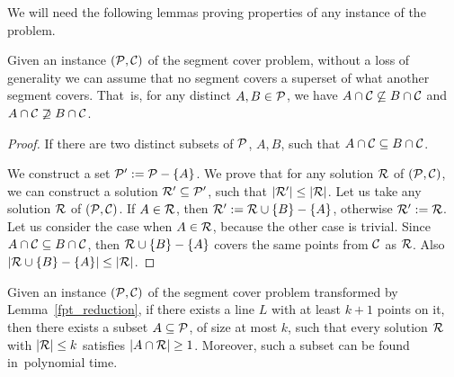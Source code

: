 We will need the following lemmas proving properties of any
instance of the problem.

\begin{lemma}
   \label{fpt_reduction}
   Given an instance $(\mathcal{P}, \mathcal{C})$ of the segment cover problem,
   without a loss of generality we can assume that
   no segment covers a superset of what another segment covers.
   That~is, for any distinct $A, B \in \mathcal{P}$, we have
   $A \cap \mathcal{C} \not \subseteq B \cap \mathcal{C}$ and $A \cap \mathcal{C} \not \supseteq B \cap \mathcal{C}$.
\end{lemma}   
   
\begin{proof} 
If there are two distinct subsets of $\mathcal{P}$,
$A, B$, such that $A \cap \mathcal{C} \subseteq B \cap \mathcal{C}$.

We construct a set $\mathcal{P}' := \mathcal{P} - \{A\}$.
We prove that for any solution $\mathcal{R}$ of $(\mathcal{P}, \mathcal{C})$,
we can construct a solution $\mathcal{R}' \subseteq \mathcal{P}'$,
such that $|\mathcal{R}'| \le |\mathcal{R}|$.
Let us take any solution $\mathcal{R}$ of $(\mathcal{P}, \mathcal{C})$.
If $A \in \mathcal{R}$, then $\mathcal{R}' := \mathcal{R} \cup \{B\} - \{A\}$,
otherwise $\mathcal{R}' := \mathcal{R}$.
Let us consider the case when $A \in \mathcal{R}$,
because the other case is trivial.
Since $A \cap \mathcal{C} \subseteq B \cap \mathcal{C}$,
then $\mathcal{R} \cup \{B\} - \{A\}$
covers the same points from $\mathcal{C}$ as $\mathcal{R}$.
Also $|\mathcal{R} \cup \{B\} - \{A\}| \le |\mathcal{R}|$.
\end{proof}

\begin{lemma}
	\label{fpt_long_lines}
	Given an instance $(\mathcal{P}, \mathcal{C})$
	of the segment cover problem 
	transformed by Lemma~\ref{fpt_reduction},
	if there exists a line $L$ with at least
	$k+1$ points on it, then there exists a subset $A \subseteq \mathcal{P}$,
	of size at most $k$,
	such that every solution $\mathcal{R}$ with $|\mathcal{R}| \le k$
	satisfies $|A \cap \mathcal{R}| \ge 1$.
	Moreover, such a subset can be found in~polynomial time.
\end{lemma}

